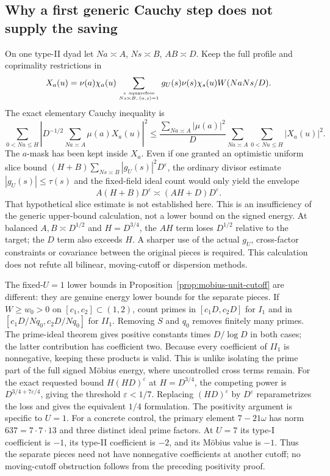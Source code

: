 \documentclass[11pt]{article}
\theoremstyle{definition}\newtheorem{definition}[theorem]{Definition}
\theoremstyle{remark}\newtheorem{remark}[theorem]{Remark}
\begin{document}
\subsection{Why a first generic Cauchy step does not supply the saving}
On one type-II dyad let $Na\asymp A$, $Ns\asymp B$, $AB\asymp D$.
Keep the full profile and coprimality restrictions in
\[
 X_a(u)=\nu(a)\chi_a(u)
  \sum_{s\ {\rm squarefree}\atop Ns\asymp B,\,(a,s)=1}
  g_U(s)\nu(s)\chi_s(u)W(NaNs/D).
\]
The exact elementary Cauchy inequality is
\[
 \sum_{0<Nu\le H}\left|D^{-1/2}\sum_{Na\asymp A}\mu(a)X_a(u)\right|^2
 \le \frac{\sum_{Na\asymp A}|\mu(a)|^2}{D}
       \sum_{Na\asymp A}\sum_{0<Nu\le H}|X_a(u)|^2.
\]
The $a$-mask has been kept inside $X_a$. Even if one granted an optimistic
uniform slice bound $(H+B)\sum_{Ns\asymp B}|g_U(s)|^2D^\varepsilon$,
the ordinary divisor estimate $|g_U(s)|\le\tau(s)$ and the fixed-field
ideal count would only yield the envelope
\[
 A(H+B)D^\varepsilon\asymp(AH+D)D^\varepsilon.
\]
That hypothetical slice estimate is not established here. This is an
insufficiency of the generic upper-bound calculation, not a lower bound
on the signed energy. At balanced $A,B\asymp D^{1/2}$ and $H=D^{3/4}$,
the $AH$ term loses $D^{1/2}$ relative to the target; the $D$ term also
exceeds $H$. A sharper use of the actual $g_U$, cross-factor constraints
or covariance between the original pieces is required. This calculation
does not refute all bilinear, moving-cutoff or dispersion methods.

The fixed-$U=1$ lower bounds in
Proposition~\ref{prop:mobius-unit-cutoff} are different: they are genuine
energy lower bounds for the separate pieces. If $W\ge w_0>0$ on
$[c_1,c_2]\subset(1,2)$, count primes in
$[c_1D,c_2D]$ for $I_1$ and in
$[c_1D/Nq_0,c_2D/Nq_0]$ for $II_1$. Removing $S$ and $q_0$ removes
finitely many primes. The prime-ideal theorem gives positive constants
times $D/\log D$ in both cases; the latter contribution has coefficient
two. Because every coefficient of $II_1$ is nonnegative, keeping these
products is valid. This is unlike isolating the prime part of the full
signed M\"obius energy, where uncontrolled cross terms remain.
For the exact requested bound $H(HD)^\varepsilon$ at $H=D^{3/4}$,
the competing power is $D^{3/4+7\varepsilon/4}$, giving the threshold
$\varepsilon<1/7$. Replacing $(HD)^\varepsilon$ by $D^\varepsilon$
reparametrizes the loss and gives the equivalent $1/4$ formulation.
The positivity argument is specific to $U=1$. For a concrete control,
the primary element $7-21\omega$ has norm $637=7\cdot7\cdot13$ and
three distinct ideal prime factors. At $U=7$ its type-I coefficient is
$-1$, its type-II coefficient is $-2$, and its M\"obius value is $-1$.
Thus the separate pieces need not have nonnegative coefficients at another
cutoff; no moving-cutoff obstruction follows from the preceding positivity
proof.
\end{document}
